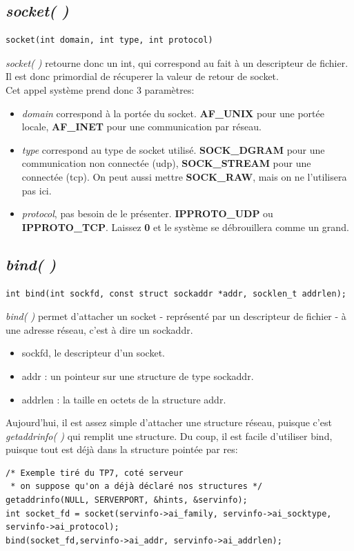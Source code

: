 \documentclass{report}
\begin{document}
\subsection{\emph{socket( )}}
\begin{verbatim}
socket(int domain, int type, int protocol)
\end{verbatim}
\emph{socket( )} retourne donc un int, qui correspond au fait à un descripteur de fichier. Il est donc primordial de récuperer la valeur de retour de socket.\\
Cet appel système prend donc 3 paramètres:
\begin{itemize}
\item{\emph{domain} correspond à la portée du socket. \textbf{AF\_UNIX} pour une portée locale, \textbf{AF\_INET} pour une communication par réseau.}
\item{\emph{type} correspond au type de socket utilisé. \textbf{SOCK\_DGRAM} pour une communication non connectée (udp), \textbf{SOCK\_STREAM} pour une connectée (tcp). On peut aussi mettre \textbf{SOCK\_RAW}, mais on ne l'utilisera pas ici.}
\item{\emph{protocol}, pas besoin de le présenter. \textbf{IPPROTO\_UDP} ou \textbf{IPPROTO\_TCP}. Laissez \textbf{0} et le système se débrouillera comme un grand.}
\end{itemize}

\subsection{\emph{bind( )}}
\begin{verbatim}
int bind(int sockfd, const struct sockaddr *addr, socklen_t addrlen);
\end{verbatim}
\emph{bind( )} permet d'attacher un socket - représenté par un descripteur de fichier - à une adresse réseau, c'est à dire un sockaddr.

\begin{itemize}
\item{sockfd, le descripteur d'un socket.}
\item{addr : un pointeur sur une structure de type sockaddr.} 
\item{addrlen : la taille en octets de la structure addr.}
\end{itemize}
Aujourd'hui, il est assez simple d'attacher une structure réseau, puisque c'est \emph{getaddrinfo( )} qui remplit une structure. Du coup, il est facile d'utiliser bind, puisque tout est déjà dans la structure pointée par res:
\begin{lstlisting}
/* Exemple tiré du TP7, coté serveur
 * on suppose qu'on a déjà déclaré nos structures */
getaddrinfo(NULL, SERVERPORT, &hints, &servinfo);
int socket_fd = socket(servinfo->ai_family, servinfo->ai_socktype, servinfo->ai_protocol);
bind(socket_fd,servinfo->ai_addr, servinfo->ai_addrlen);
\end{lstlisting}
\end{document}
